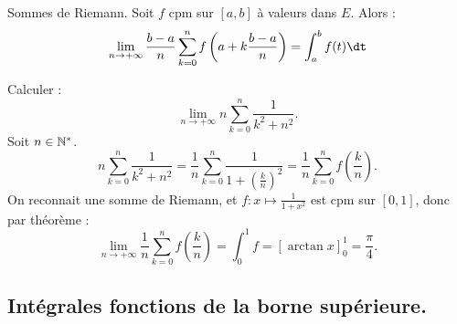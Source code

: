 \documentclass[11pt]{article}
\begin{document}
\begin{thm}{Sommes de Riemann.}{}
    Soit $f$ cpm sur $[a,b]$ à valeurs dans $E$. Alors :
    \begin{equation*}
        \lim_{n\to+\infty}\frac{b-a}{n}\sum_{k=0}^n f\left( a + k\frac{b-a}{n} \right) = \int_a^b f(t)\dt
    \end{equation*}
\end{thm}

\pagebreak

\begin{ex}{}{}
    Calculer :
    \begin{equation*}
        \lim_{n\to+\infty} n\sum_{k=0}^n\frac{1}{k^2+n^2}.
    \end{equation*}
    \tcblower
    Soit $n\in\mathbb{N}^*$.
    \begin{equation*}
        n\sum_{k=0}^n\frac{1}{k^2+n^2} = \frac{1}{n}\sum_{k=0}^n\frac{1}{1+\left( \frac{k}{n} \right)^2} = \frac{1}{n}\sum_{k=0}^nf\left( \frac{k}{n} \right).
    \end{equation*}
    On reconnait une somme de Riemann, et $f:x\mapsto \frac{1}{1+x^2}$ est cpm sur $[0,1]$, donc par théorème :
    \begin{equation*}
        \lim_{n\to+\infty}\frac{1}{n}\sum_{k=0}^nf\left( \frac{k}{n} \right) = \int_0^1 f = \left[ \arctan x \right]_0^1 = \frac{\pi}{4}.
    \end{equation*}
\end{ex}

\vspace*{-0.7cm}

\subsection{Intégrales fonctions de la borne supérieure.}
\end{document}
